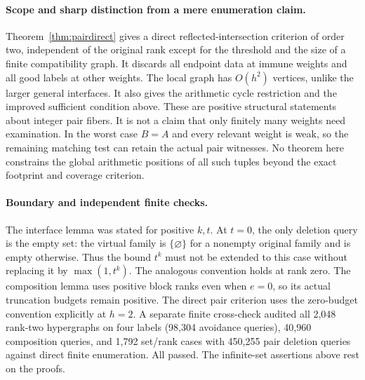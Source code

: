 \documentclass[11pt]{article}
\theoremstyle{remark}\newtheorem{remark}[theorem]{Remark}
\begin{document}
\paragraph{Scope and sharp distinction from a mere enumeration claim.}
Theorem~\ref{thm:pairdirect} gives a direct reflected-intersection criterion of order two, independent of the original rank except for the threshold and the size of a finite compatibility graph. It discards all endpoint data at immune weights and all good labels at other weights. The local graph has $O(h^2)$ vertices, unlike the larger general interfaces. It also gives the arithmetic cycle restriction and the improved sufficient condition above. These are positive structural statements about integer pair fibers. It is not a claim that only finitely many weights need examination. In the worst case $B=A$ and every relevant weight is weak, so the remaining matching test can retain the actual pair witnesses. No theorem here constrains the global arithmetic positions of all such tuples beyond the exact footprint and coverage criterion.

\paragraph{Boundary and independent finite checks.}
The interface lemma was stated for positive $k,t$. At $t=0$, the only deletion query is the empty set: the virtual family is $\{\varnothing\}$ for a nonempty original family and is empty otherwise. Thus the bound $t^k$ must not be extended to this case without replacing it by $\max(1,t^k)$. The analogous convention holds at rank zero. The composition lemma uses positive block ranks even when $e=0$, so its actual truncation budgets remain positive. The direct pair criterion uses the zero-budget convention explicitly at $h=2$. A separate finite cross-check audited all 2,048 rank-two hypergraphs on four labels (98,304 avoidance queries), 40,960 composition queries, and 1,792 set/rank cases with 450,255 pair deletion queries against direct finite enumeration. All passed. The infinite-set assertions above rest on the proofs.
\end{document}
